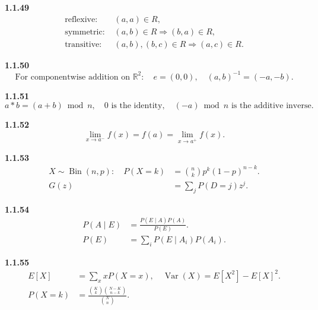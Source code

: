 \noindent\textbf{1.1.49}\quad
\begin{equation}
\begin{aligned}
\text{reflexive: }&(a,a)\in R,\\
\text{symmetric: }&(a,b)\in R\Rightarrow(b,a)\in R,\\
\text{transitive: }&(a,b),(b,c)\in R\Rightarrow(a,c)\in R.
\end{aligned}
\tag{1.1.49.1}\label{eq:relation-properties-49}
\end{equation}

\noindent\textbf{1.1.50}\quad
\begin{equation}
\text{For componentwise addition on }\mathbb R^2:\quad
e=(0,0),\quad(a,b)^{-1}=(-a,-b).
\tag{1.1.50.1}\label{eq:componentwise-operation-50}
\end{equation}

\noindent\textbf{1.1.51}\quad
\begin{equation}
a*b=(a+b)\bmod n,\quad
0\text{ is the identity},\quad
(-a)\bmod n\text{ is the additive inverse}.
\tag{1.1.51.1}\label{eq:modular-operation-51}
\end{equation}

\noindent\textbf{1.1.52}\quad
\begin{equation}
\lim_{x\to a^-}f(x)=f(a)=\lim_{x\to a^+}f(x).
\tag{1.1.52.1}\label{eq:continuity-limits-52}
\end{equation}

\noindent\textbf{1.1.53}\quad
\begin{align}
X\sim\operatorname{Bin}(n,p):\quad
P(X=k)&=\binom nkp^k(1-p)^{n-k}.
\tag{1.1.53.1}\label{eq:binomial-53}\\
G(z)&=\sum_jP(D=j)z^j.
\tag{1.1.53.2}\label{eq:walk-pgf}
\end{align}

\noindent\textbf{1.1.54}\quad
\begin{align}
P(A\mid E)&=\frac{P(E\mid A)P(A)}{P(E)}.
\tag{1.1.54.1}\label{eq:bayes-54}\\
P(E)&=\sum_iP(E\mid A_i)P(A_i).
\tag{1.1.54.2}\label{eq:total-probability-54}
\end{align}

\noindent\textbf{1.1.55}\quad
\begin{align}
E[X]&=\sum_x xP(X=x),\quad
\operatorname{Var}(X)=E[X^2]-E[X]^2.
\tag{1.1.55.1}\label{eq:mean-variance-55}\\
P(X=k)&=\frac{\binom Kk\binom{N-K}{n-k}}{\binom Nn}.
\tag{1.1.55.2}\label{eq:hypergeometric-55}
\end{align}

